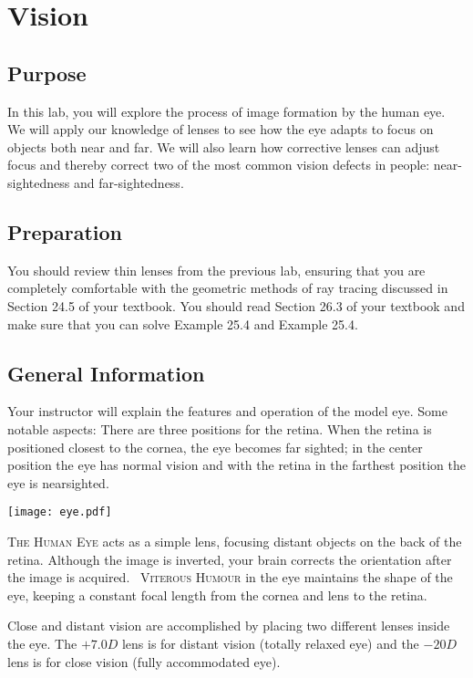 \chapter{Vision}

\section{Purpose}
In this lab, you will explore the process of image formation by the human eye.  We will apply our knowledge of lenses to see how the eye adapts to focus on objects both near and far.  We will also learn how corrective lenses can adjust focus and thereby correct two of the most common vision defects in people: near-sightedness and far-sightedness.

\section{Preparation}
You should review thin lenses from the previous lab, ensuring that you are completely comfortable with the geometric methods of ray tracing discussed in Section 24.5 of your textbook.  You should read Section 26.3 of your textbook and make sure that you can solve Example 25.4 and Example 25.4.

\section{General Information}
Your instructor will explain the features and operation of the model eye. Some notable aspects: There are three positions for the retina. When the retina is positioned closest to the cornea, the eye becomes far sighted; in the center position the eye has normal vision and with the retina in the farthest position the eye is nearsighted. 

\begin{marginfigure}
	\texttt{[image: eye.pdf]}
	\caption[Human Eye as a Simple Lens]{\textsc{The Human Eye} acts as a simple lens, focusing distant objects on the back of the retina.  Although the image is inverted, your brain corrects the orientation after the image is acquired.\newline~ \newline \textsc{Viterous Humour} in the eye maintains the shape of the eye, keeping a constant focal length from the cornea and lens to the retina.}
\end{marginfigure}
Close and distant vision are accomplished by placing two different lenses inside the eye. The $+7.0D$ lens is for distant vision (totally relaxed eye) and the $-20D$ lens is for close vision (fully accommodated eye).

